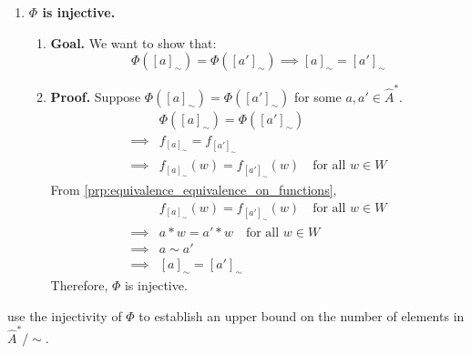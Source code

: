 \begin{proofE}
\begin{enumerate}
    \item \textbf{$\Phi$ is injective.}
    \begin{enumerate}
        \item \textbf{Goal.}
        We want to show that:
        \begin{equation}
            \Phi([a]_{\sim}) = \Phi([a']_{\sim}) \implies [a]_{\sim} = [a']_{\sim}
        \end{equation}
        
        \item \textbf{Proof.}
        Suppose $\Phi([a]_{\sim}) = \Phi([a']_{\sim})$ for some $a, a' \in \hat{A}^{*}$.
        \begin{align}
            & \Phi([a]_{\sim}) = \Phi([a']_{\sim}) \\
            \implies & f_{[a]_{\sim}} = f_{[a']_{\sim}} \\
            \implies & f_{[a]_{\sim}}(w) = f_{[a']_{\sim}}(w) \quad \text{for all $w \in W$}
        \end{align}
        From \cref{prp:equivalence_equivalence_on_functions},
        \begin{align}
            & f_{[a]_{\sim}}(w) = f_{[a']_{\sim}}(w) \quad \text{for all $w \in W$} \\
            \implies & a \ast w = a' \ast w \quad \text{for all $w \in W$} \\
            \implies & a \sim a' \\
            \implies & [a]_{\sim} = [a']_{\sim}
        \end{align}
        Therefore, $\Phi$ is injective.
    \end{enumerate}
\end{enumerate}
\end{proofE}


 use the injectivity of $\Phi$ to establish an upper bound on the number of elements in $\hat{A}^{\ast}/\sim$.

